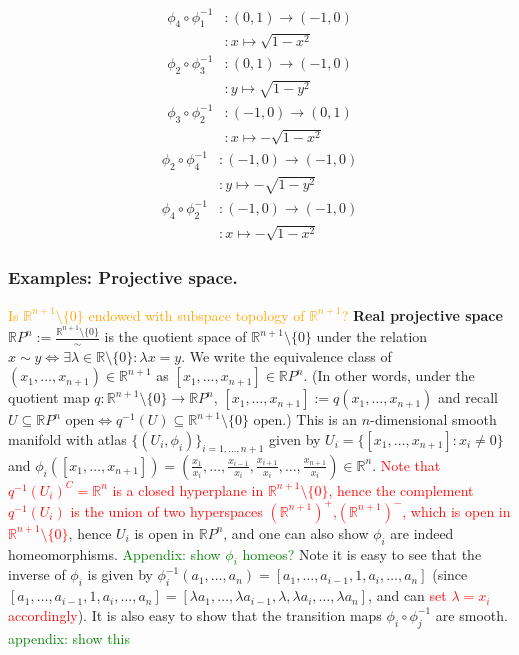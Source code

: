 \documentclass[a4paper]{article}
\theoremstyle{definition} \newtheorem*{definition}{Definition}
\theoremstyle{definition} \newtheorem*{definitions}{Definitions}
\theoremstyle{plain} \newtheorem{theorem}{Theorem}[section]
\theoremstyle{plain} \newtheorem{proposition}[theorem]{Proposition}
\theoremstyle{plain} \newtheorem{corollary}[theorem]{Corollary}
\theoremstyle{plain} \newtheorem{lemma}[theorem]{Lemma}
\theoremstyle{plain} \newtheorem{example}[theorem]{Example}
\newcommand{\checkCorrect}[1]{\textcolor{red}{#1}}
\newcommand{\question}[1]{\textcolor{orange}{#1}}
\newcommand{\finish}[1]{\textcolor{green}{#1}}
\newcommand{\defn}[1]{\textbf{#1}}
\newcommand{\realnos}{\mathbb{R}}
\begin{document}
\begin{align*}
\phi_4 \circ \phi_1^{-1} & : (0,1) \to (-1, 0) \\
& : x \mapsto \sqrt{1-x^2}
\end{align*}
\begin{align*}
\phi_2 \circ \phi_3^{-1} & : (0,1) \to (-1, 0) \\
& : y \mapsto \sqrt{1-y^2}
\end{align*}
\begin{align*}
\phi_3 \circ \phi_2^{-1} & : (-1,0) \to (0,1)\\
& : x \mapsto -\sqrt{1-x^2}
\end{align*}
\begin{align*}
\phi_2 \circ \phi_4^{-1} & : (-1,0) \to (-1,0)\\
& : y \mapsto -\sqrt{1-y^2}
\end{align*}
\begin{align*}
\phi_4 \circ \phi_2^{-1} & : (-1,0) \to (-1,0)\\
& : x \mapsto -\sqrt{1-x^2}
\end{align*}

\subsubsection{Examples: Projective space.}

\question{Is $\realnos^{n+1}\setminus \{0\}$ endowed with subspace topology of $\realnos^{n+1}$?}
\defn{Real projective space} $\realnos P^n := \frac{\realnos^{n+1}\setminus \{0\}}{\sim}$ is the quotient space of $\realnos^{n+1}\setminus \{0\}$ under the relation $x\sim y \iff \exists \lambda \in \realnos \setminus \{0\} : \lambda x=y$. We write the equivalence class of $(x_1, \ldots, x_{n+1})\in \realnos^{n+1}$ as $[x_1, \ldots, x_{n+1}]\in \realnos P^n$. (In other words, under the quotient map $q:\realnos^{n+1}\setminus \{0\}\to \realnos P^n$, $[x_1, \ldots, x_{n+1}]:=q(x_1, \ldots, x_{n+1})$ and recall $U \subseteq \realnos P^n \textrm{ open} \iff q^{-1}(U) \subseteq \realnos^{n+1}\setminus \{0\} \textrm{ open}$.) This is an $n$-dimensional smooth manifold with atlas $\{(U_i, \phi_i)\}_{i=1, \ldots, n+1}$ given by $U_i=\{[x_1, \ldots, x_{n+1}]: x_i\neq 0\}$ and $\phi_i([x_1, \ldots, x_{n+1}])=(\frac{x_1}{x_i}, \ldots , \frac{x_{i-1}}{x_i}, \frac{x_{i+1}}{x_i}, \ldots, \frac{x_{n+1}}{x_i})\in \realnos^n$. \checkCorrect{Note that $q^{-1}(U_i)^C=\realnos^n$ is a closed hyperplane in $\realnos^{n+1}\setminus \{0\}$, hence the complement $q^{-1}(U_i)$ is the union of two hyperspaces $(\realnos^{n+1})^+$,$(\realnos^{n+1})^-$, which is open in $\realnos^{n+1}\setminus \{0\}$}, hence $U_i$ is open in $\realnos P^n$, and one can also show $\phi_i$ are indeed homeomorphisms. \finish{Appendix: show $\phi_i$ homeos?} Note it is easy to see that the inverse of $\phi_i$ is given by $\phi_i^{-1}(a_1, \ldots, a_n)=[a_1, \ldots, a_{i-1}, 1, a_{i}, \ldots, a_n]$ (since $[a_1, \ldots, a_{i-1}, 1, a_{i}, \ldots, a_n]=[\lambda a_1, \ldots, \lambda a_{i-1}, \lambda, \lambda a_{i}, \ldots, \lambda a_n]$, and can \checkCorrect{set $\lambda=x_i$ accordingly}). It is also easy to show that the transition maps $\phi_i\circ \phi_j^{-1}$ are smooth. \finish{appendix: show this}
\end{document}
